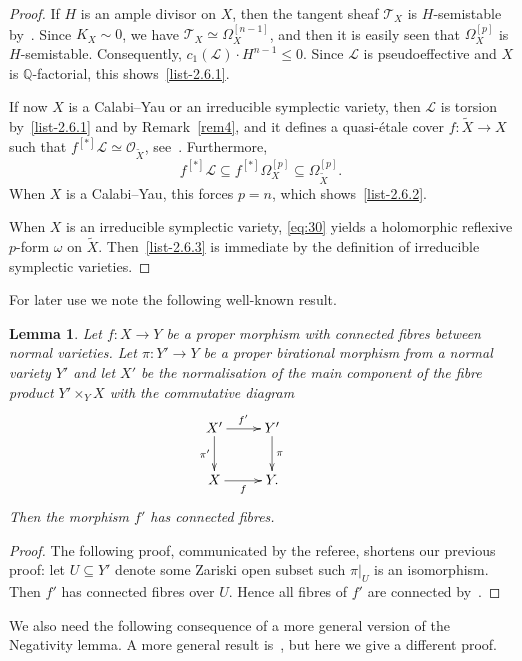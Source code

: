 \documentclass[11pt]{article}
\newtheorem{lemm}[theo]{Lemma}
\theoremstyle{definition}
\numberwithin{equation}{section}
\numberwithin{figure}{section}
\numberwithin{table}{section}
\newcommand{\Qbb}{\mathbb{Q}} %
\newcommand\sL{\mathcal{L}}
\newcommand\sT{\mathcal{T}}
\newcommand{\OO}{\mathcal{O}}
\begin{document}
\begin{proof}
If $H$ is an ample divisor on $X$, then the tangent sheaf $\sT_X$ is $H$-semistable by~\cite[Proposition~5.4]{GKP16}. Since $K_X\sim0$, we have $\sT_X\simeq\Omega_X^{[n-1]}$, and then it is easily seen that $\Omega^{[p]}_X$ is $H$-semistable. Consequently, $c_1(\sL) \cdot H^{n-1} \leq 0$. Since $\sL$ is pseudoeffective and $X$ is $\Qbb$-factorial, this shows~\eqref{list-2.6.1}.

If now $X$ is a Calabi--Yau or an irreducible symplectic variety, then $\sL$ is torsion by~\eqref{list-2.6.1} and by Remark~\ref{rem4}, and it defines a quasi-étale cover $f\colon \widetilde X \to X$ such that $f^{[*]}\sL\simeq\OO_{\widetilde X}$, see~\cite[Lemma~2.53]{KM98}. Furthermore,
\begin{equation}\label{eq:30}
f^{[*]}\sL \subseteq f^{[*]}\Omega^{[p]}_X \subseteq \Omega^{[p]}_{\widetilde X}.
\end{equation}
When $X$ is a Calabi--Yau, this forces $p = n$, which shows~\eqref{list-2.6.2}.

When $X$ is an irreducible symplectic variety, \eqref{eq:30} yields a holomorphic reflexive $p$-form $\omega $ on $\widetilde X$. Then~\eqref{list-2.6.3} is immediate by the definition of irreducible symplectic varieties.
\end{proof}

For later use we note the following well-known result.

\begin{lemm}\label{lem4}
Let $f\colon X\to Y$ be a proper morphism with connected fibres between normal varieties. Let $\pi\colon Y'\to Y$ be a proper birational morphism from a normal variety $Y'$ and let $X'$ be the normalisation of the main component of the fibre product $Y'\times_Y X$ with the commutative diagram
\[
\xymatrix{ X' \ar[d]_-{\pi'} \ar[r]^{f'} & Y' \ar[d]^-\pi \\ 
X \ar[r]_f & Y. & }
\]
Then the morphism $f'$ has connected fibres.
\end{lemm}

\begin{proof}
The following proof, communicated by the referee, shortens our previous proof: let $U \subseteq Y'$ denote some Zariski open subset such $\pi|_U$ is an isomorphism. Then $f'$ has connected fibres over $U$. Hence all fibres of $f'$ are connected by~\cite[Corollary~1.12]{Ue75}.
\end{proof}

We also need the following consequence of a more general version of the Negativity lemma. A more general result is~\cite[Corollary~13]{KL09}, but here we give a different proof.
\end{document}
